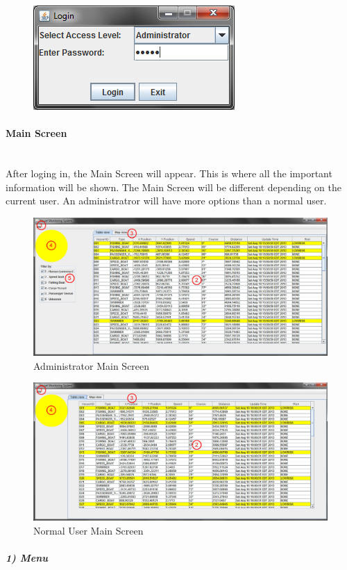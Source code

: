 \documentclass{article}
\begin{document}
	\begin{figure}[!htb]
	\centering
	\includegraphics[scale=0.70]{images/userManual1.jpg}
	\end{figure}

\paragraph{Main Screen \\ \\}
After loging in, the Main Screen will appear. This is where all the important information will be shown. The Main Screen will be different depending on the current user. An administratror will have more options than a normal user. 

	\begin{figure}[!htb]
	\caption{Administrator Main Screen}
	\centering
	\includegraphics[scale=0.35]{images/userManual2_admin.jpg}
	\end{figure}

	\begin{figure}[!htb]
	\caption{Normal User Main Screen}
	\centering
	\includegraphics[scale=0.35]{images/userManual2_user.jpg}
	\end{figure}
\break
\subparagraph{1) Menu \\ \\}
\end{document}
